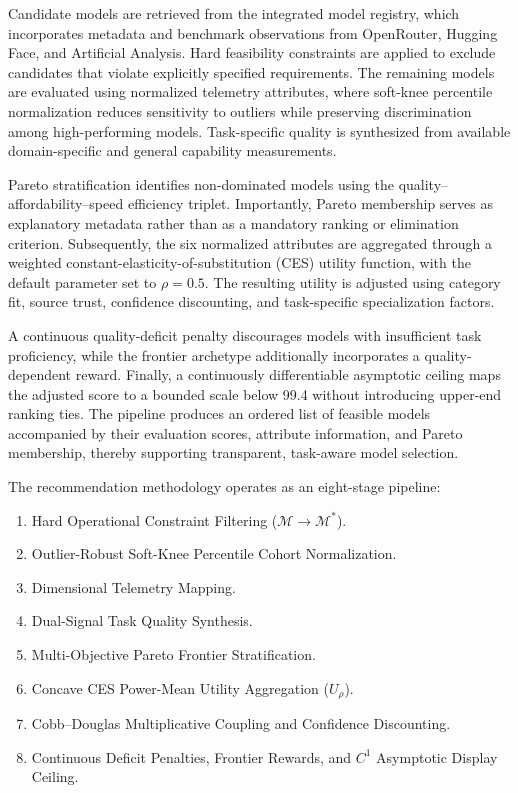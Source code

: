 \documentclass[pdflatex,sn-mathphys-num]{sn-jnl}
\theoremstyle{thmstyleone}
\theoremstyle{thmstylethree}
\begin{document}
Candidate models are retrieved from the integrated model registry, which incorporates metadata and benchmark observations from OpenRouter, Hugging Face, and Artificial Analysis. Hard feasibility constraints are applied to exclude candidates that violate explicitly specified requirements. The remaining models are evaluated using normalized telemetry attributes, where soft-knee percentile normalization reduces sensitivity to outliers while preserving discrimination among high-performing models. Task-specific quality is synthesized from available domain-specific and general capability measurements.

Pareto stratification identifies non-dominated models using the quality--affordability--speed efficiency triplet. Importantly, Pareto membership serves as explanatory metadata rather than as a mandatory ranking or elimination criterion. Subsequently, the six normalized attributes are aggregated through a weighted constant-elasticity-of-substitution (CES) utility function, with the default parameter set to $\rho = 0.5$. The resulting utility is adjusted using category fit, source trust, confidence discounting, and task-specific specialization factors.

A continuous quality-deficit penalty discourages models with insufficient task proficiency, while the frontier archetype additionally incorporates a quality-dependent reward. Finally, a continuously differentiable asymptotic ceiling maps the adjusted score to a bounded scale below 99.4 without introducing upper-end ranking ties. The pipeline produces an ordered list of feasible models accompanied by their evaluation scores, attribute information, and Pareto membership, thereby supporting transparent, task-aware model selection.

The recommendation methodology operates as an eight-stage pipeline:
\begin{enumerate}
  \item Hard Operational Constraint Filtering ($\mathcal{M} \to \mathcal{M}^*$).
  \item Outlier-Robust Soft-Knee Percentile Cohort Normalization.
  \item Dimensional Telemetry Mapping.
  \item Dual-Signal Task Quality Synthesis.
  \item Multi-Objective Pareto Frontier Stratification.
  \item Concave CES Power-Mean Utility Aggregation ($U_\rho$).
  \item Cobb--Douglas Multiplicative Coupling and Confidence Discounting.
  \item Continuous Deficit Penalties, Frontier Rewards, and $C^1$ Asymptotic Display Ceiling.
\end{enumerate}
\end{document}
